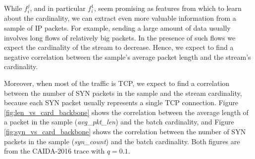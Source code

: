 		While $f_i^j$, and in particular $f_i^1$, seem promising as features from which to learn about the cardinality, we can extract even more valuable information from a sample of IP packets. For example, sending a large amount of data usually involves long flows of relatively big packets. In the presence of such flows we expect the cardinality of the stream to decrease. Hence, we expect to find a negative correlation between the sample's average packet length and the stream's cardinality. 
		
		Moreover, when most of the traffic is TCP, we expect to find a correlation between the number of SYN packets in the sample and the stream cardinality, because each SYN packet usually represents a single TCP connection. Figure \ref{fig:len_vs_card_backbone} shows the correlation between the average length of a packet in the sample (\emph{avg\_pkt\_len}) and the batch cardinality, and Figure \ref{fig:syn_vs_card_backbone} shows the correlation between the number of SYN packets in the sample (\emph{syn\_count}) and the batch cardinality. Both figures are from the CAIDA-2016 trace with $q=0.1$.
		
